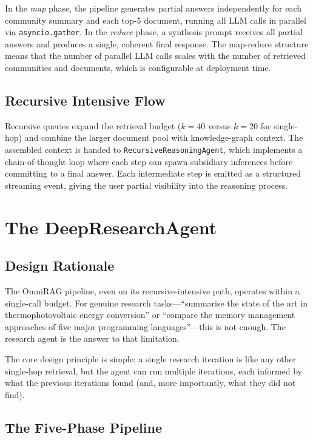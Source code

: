 In the \textit{map} phase, the pipeline generates partial answers independently
for each community summary and each top-5 document, running all LLM calls in
parallel via \texttt{asyncio.gather}. In the \textit{reduce} phase, a
synthesis prompt receives all partial answers and produces a single, coherent
final response. The map-reduce structure means that the number of parallel LLM
calls scales with the number of retrieved communities and documents, which is
configurable at deployment time.

\subsection{Recursive Intensive Flow}

Recursive queries expand the retrieval budget ($k=40$ versus $k=20$ for single-
hop) and combine the larger document pool with knowledge-graph context. The
assembled context is handed to \texttt{RecursiveReasoningAgent}, which implements
a chain-of-thought loop where each step can spawn subsidiary inferences before
committing to a final answer. Each intermediate step is emitted as a structured
streaming event, giving the user partial visibility into the reasoning process.

\section{The DeepResearchAgent}
\label{sec:deepresearch}

\subsection{Design Rationale}

The OmniRAG pipeline, even on its recursive-intensive path, operates within a
single-call budget. For genuine research tasks---``summarise the state of the art
in thermophotovoltaic energy conversion'' or ``compare the memory management
approaches of five major programming languages''---this is not enough. The research
agent is the answer to that limitation.

The core design principle is simple: a single research iteration is like any other
single-hop retrieval, but the agent can run multiple iterations, each informed by
what the previous iterations found (and, more importantly, what they did not find).

\subsection{The Five-Phase Pipeline}

